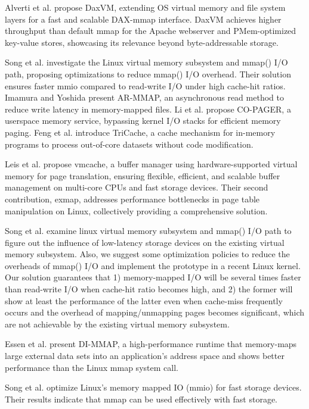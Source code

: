 Alverti et al. \cite{alverti2022daxvm} propose DaxVM, extending OS virtual memory and file system layers for a fast and scalable DAX-mmap interface. DaxVM achieves higher throughput than default mmap for the Apache webserver and PMem-optimized key-value stores, showcasing its relevance beyond byte-addressable storage.

Song et al. \cite{song2012low} investigate the Linux virtual memory subsystem and mmap() I/O path, proposing optimizations to reduce mmap() I/O overhead. Their solution ensures faster mmio compared to read-write I/O under high cache-hit ratios.
Imamura and Yoshida \cite{imamura2019poster} present AR-MMAP, an asynchronous read method to reduce write latency in memory-mapped files. Li et al. \cite{li2019userland} propose CO-PAGER, a userspace memory service, bypassing kernel I/O stacks for efficient memory paging. Feng et al. \cite{feng2023tricache} introduce TriCache, a cache mechanism for in-memory programs to process out-of-core datasets without code modification.

Leis et al. \cite{leis2023virtual} propose vmcache, a buffer manager using hardware-supported virtual memory for page translation, ensuring flexible, efficient, and scalable buffer management on multi-core CPUs and fast storage devices. Their second contribution, exmap, addresses performance bottlenecks in page table manipulation on Linux, collectively providing a comprehensive solution.




Song et al. \cite{song2012low} examine linux virtual memory subsystem and mmap() I/O path to figure out the influence of low-latency storage devices on the existing virtual memory subsystem. Also, we suggest some optimization policies to reduce the overheads of mmap() I/O and implement the prototype in a recent Linux kernel. Our solution guarantees that 1) memory-mapped I/O will be several times faster than read-write I/O when cache-hit ratio becomes high, and 2) the former will show at least the performance of the latter even when cache-miss frequently occurs and the overhead of mapping/unmapping pages becomes significant, which are not achievable by the existing virtual memory subsystem.

Essen et al. \cite{van2015di} present DI-MMAP, a high-performance runtime that memory-maps large external data sets into an application’s address space and shows better performance than the Linux mmap system call.

Song et al. \cite{song2016efficient} optimize Linux's memory mapped IO (mmio) for fast storage devices. Their results indicate that mmap can be used effectively with fast storage.

